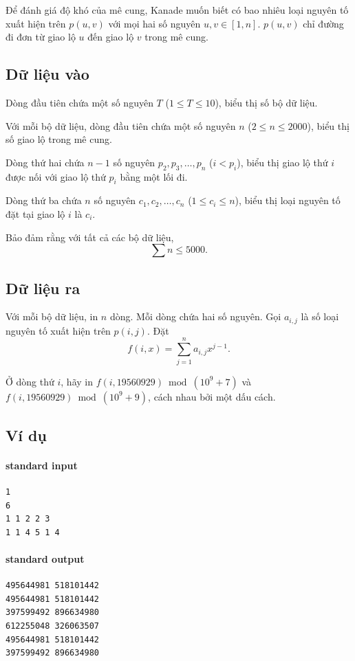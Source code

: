 \documentclass[11pt]{article}
\begin{document}
Để đánh giá độ khó của mê cung, Kanade muốn biết có bao nhiêu loại nguyên tố
xuất hiện trên \(p(u,v)\) với mọi hai số nguyên \(u,v\in[1,n]\). \(p(u,v)\)
chỉ đường đi đơn từ giao lộ \(u\) đến giao lộ \(v\) trong mê cung.

\subsection*{Dữ liệu vào}

Dòng đầu tiên chứa một số nguyên \(T\) (\(1\le T\le 10\)), biểu thị số bộ dữ
liệu.

Với mỗi bộ dữ liệu, dòng đầu tiên chứa một số nguyên \(n\)
(\(2\le n\le 2000\)), biểu thị số giao lộ trong mê cung.

Dòng thứ hai chứa \(n-1\) số nguyên \(p_2,p_3,\ldots,p_n\) (\(i<p_i\)), biểu
thị giao lộ thứ \(i\) được nối với giao lộ thứ \(p_i\) bằng một lối đi.

Dòng thứ ba chứa \(n\) số nguyên \(c_1,c_2,\ldots,c_n\) (\(1\le c_i\le n\)),
biểu thị loại nguyên tố đặt tại giao lộ \(i\) là \(c_i\).

Bảo đảm rằng với tất cả các bộ dữ liệu,
\[
  \sum n\le 5000.
\]

\subsection*{Dữ liệu ra}

Với mỗi bộ dữ liệu, in \(n\) dòng. Mỗi dòng chứa hai số nguyên. Gọi \(a_{i,j}\)
là số loại nguyên tố xuất hiện trên \(p(i,j)\). Đặt
\[
  f(i,x)=\sum_{j=1}^{n} a_{i,j}x^{j-1}.
\]

Ở dòng thứ \(i\), hãy in \(f(i,19560929)\bmod (10^9+7)\) và
\(f(i,19560929)\bmod (10^9+9)\), cách nhau bởi một dấu cách.

\subsection*{Ví dụ}

\paragraph{standard input}
\begin{verbatim}
1
6
1 1 2 2 3
1 1 4 5 1 4
\end{verbatim}

\paragraph{standard output}
\begin{verbatim}
495644981 518101442
495644981 518101442
397599492 896634980
612255048 326063507
495644981 518101442
397599492 896634980
\end{verbatim}
\end{document}
